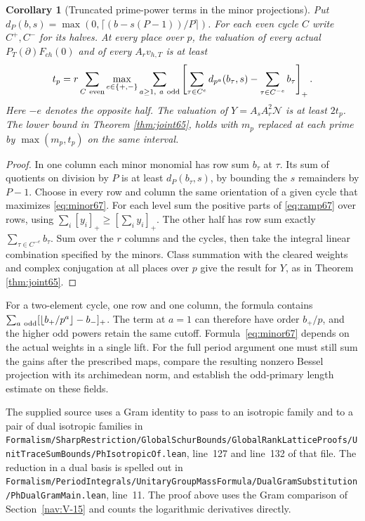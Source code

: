 \documentclass[a4paper,11pt]{article}
\newtheorem{corollary}[proposition]{Corollary}
\theoremstyle{definition}
\theoremstyle{remark}
\newcommand{\srcloc}[2]{{\small\nolinkurl{#1.lean}}, line~#2}
\numberwithin{equation}{section}
\begin{document}
\begin{corollary}[Truncated prime-power terms in the minor projections]\label{cor:minor67}
Put \(d_P(b,s)=\max(0,\lceil(b-s(P-1))/P\rceil)\). For each
even cycle \(C\) write \(C^+,C^-\) for its halves. At every
place over \(p\), the valuation of every actual
\(P_T(\partial)F_{ch}(0)\) and of every \(A_r v_{h,T}\) is at least
\begin{equation}
 t_p=r\sum_{C\ {\rm even}}\max_{e\in\{+,-\}}
    \sum_{a\ge1,\ a\ {\rm odd}}
 \left[\sum_{\tau\in C^e}d_{p^a}(b_\tau,s)
                             -\sum_{\tau\in C^{-e}}b_\tau\right]_+ .
                                                       \label{eq:minor67}
\end{equation}
Here \(-e\) denotes the opposite half. The valuation of
\(Y=A_s A_r^2\mathcal N\) is at least \(2t_p\). The lower bound
in Theorem \ref{thm:joint65}, holds with \(m_p\) replaced at
each prime by \(\max(m_p,t_p)\) on the same interval.
\end{corollary}
\begin{proof}
In one column each minor monomial has row sum \(b_\tau\) at
\(\tau\). Its sum of quotients on division by \(P\) is at least
\(d_P(b_\tau,s)\), by bounding the \(s\) remainders by \(P-1\).
Choose in every row and column the same orientation of a given cycle
that maximizes \eqref{eq:minor67}. For each level sum the positive
parts of \eqref{eq:ramp67} over rows, using
\(\sum_i[y_i]_+\ge[\sum_i y_i]_+\). The other half has row
sum exactly \(\sum_{\tau\in C^{-e}}b_\tau\). Sum over the \(r\)
columns and the cycles, then take the integral linear combination
specified by the minors. Class summation with the cleared
weights and complex conjugation at all places over \(p\) give
the result for \(Y\), as in Theorem \ref{thm:joint65}.
\end{proof}

For a two-element cycle, one row and one column, the formula
contains \(\sum_{a\ {\rm odd}}[\lfloor b_+/p^a\rfloor-b_-]_+\).
The term at \(a=1\) can therefore have order \(b_+/p\), and
the higher odd powers retain the same cutoff. Formula~\eqref{eq:minor67}
depends on the actual weights in a single lift. For the full
period argument one must still sum the gains after the prescribed
maps, compare the resulting nonzero Bessel projection with its
archimedean norm, and establish the odd-primary length estimate on
these fields.

The supplied source uses a Gram identity to pass to an isotropic
family and to a pair of dual isotropic families in
\srcloc{Formalism/SharpRestriction/GlobalSchurBounds/GlobalRankLatticeProofs/UnitTraceSumBounds/PhIsotropicOf}{127}
and line~132 of that file. The reduction in a dual basis is
spelled out in
\srcloc{Formalism/PeriodIntegrals/UnitaryGroupMassFormula/DualGramSubstitution/PhDualGramMain}{11}.
The proof above uses the Gram comparison of Section~\ref{nav:V-15} and counts
the logarithmic derivatives directly.
\end{document}
